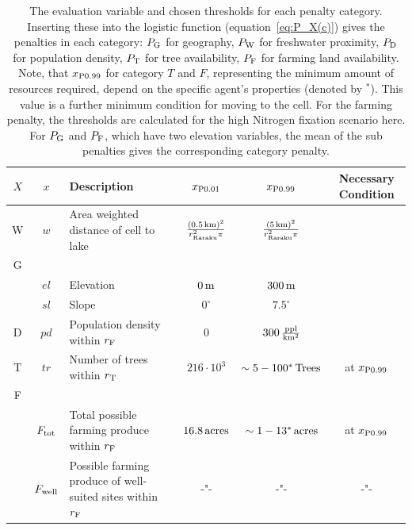  \begin{table}
	\centering
	\begin{tabular}{c|c|L|c|c|S}
		$X$ & $x$& Description & $x_{\rm P0.01}$ & $x_{\rm P0.99}$ & Necessary Condition \\ \hline
		W &$w$ & Area weighted distance of cell to lake & $\frac{(0.5\, {\rm km})^2}{r_\text{Raraku}^2\pi}$ & $\frac{(5\, {\rm km})^2}{r_\text{Raraku}^2\pi}$\\
		G & & & & & \\
		& $el$ & Elevation & $0\, {\rm m}$ & $300\, {\rm m}$ & \\
		& $sl$ & Slope & $0^\circ$ & $7.5^\circ$ & \\
		D & $pd$ & Population density within $r_{\rm F}$ & 0 & $300\, {\rm \frac{ppl}{km^2}}$ & \\
		T & $tr$ & Number of trees within $r_{\rm T}$ & $216\cdot 10^3$ & $\sim 5-100^* \, {\rm Trees}$ &  at $x_{\rm P0.99}$\\
		F & & & & & \\
		& $F_{\rm tot}$ & Total possible farming produce within $r_{\rm F}$ & $16.8 \, \rm{acres}$  & $\sim 1-13^* \, \rm{acres}$& at $x_{\rm P0.99}$\\
		& $F_{\rm well}$ & Possible farming produce of well-suited sites within $r_{\rm F}$ & -"- & -"- & -"-\\
	\end{tabular}
\caption{The evaluation variable and chosen thresholds for each penalty category.
	Inserting these into the logistic function (equation~\ref{eq:P_X(c)}) gives the penalties in each category:
	$P_{\rm G}$ for geography, $P_{\rm W}$ for freshwater proximity, $P_{\rm D}$ for population density, $P_{\rm T}$ for tree availability, $P_{\rm F}$ for farming land availability.
	Note, that $x_{\rm P0.99}$ for category $T$ and $F$, representing the minimum amount of resources required, depend on the specific agent's properties (denoted by $^*$).
	This value is a further minimum condition for moving to the cell. For the farming penalty, the thresholds are calculated for the high Nitrogen fixation scenario here.
	For $P_{\rm G}$ and $P_{\rm F}$, which have two elevation variables, the mean of the sub penalties gives the corresponding category penalty.
}
\label{tab:x01x09} 
\end{table}


